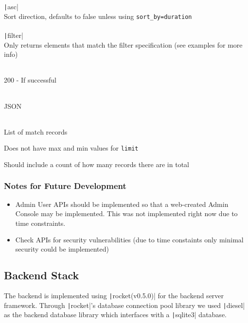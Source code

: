 \documentclass{article}
\begin{document}
\begin{description}
\begin{description}
    \texttt|asc| \\
    Sort direction, defaults to false unless using \texttt{sort_by=duration} \vspace{0.5em} \\ \\
    \texttt|filter| \\
    Only returns elements that match the filter specification (see examples for more info)
    \item[Response Status] \hfill \\
    200 - If successful
    \item[Response Body Format] \hfill \\
    JSON
    \item[Response Body] \hfill \\
    List of match records
    \item[Known Issues] 
    \item Does not have max and min values for \texttt{limit}
    \item Should include a count of how many records there are in total
  \end{description}
\end{description}

\subsubsection{Notes for Future Development}

\begin{itemize}
  \item[] Admin User APIs should be implemented so that a web-created Admin Console may be implemented.
  This was not implemented right now due to time constraints.
  \item[] Check APIs for security vulnerabilities (due to time constaints only minimal security could be implemented)
\end{itemize}

\subsection{Backend Stack}

The backend is implemented using \texttt|rocket(v0.5.0)| for the backend server framework. 
Through \texttt|rocket|'s database connection pool library we used \texttt|diesel|
as the backend database library which interfaces with a \texttt|sqlite3| database.
\end{document}
